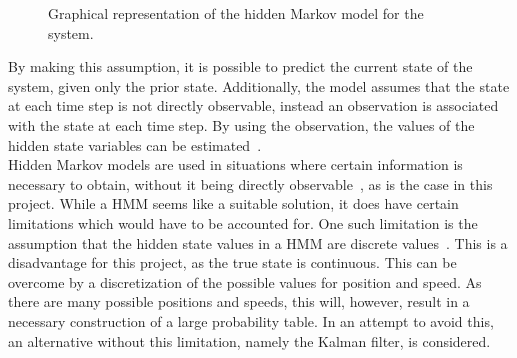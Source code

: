\begin{figure}[H]
\begin{center}
\end{center}
\caption{Graphical representation of the hidden Markov model for the system.}
\label{fig:hmm}
\end{figure}

By making this assumption, it is possible to predict the current state of the system, given only the prior state. Additionally, the model assumes that the state at each time step is not directly observable, instead an observation is associated with the state at each time step. By using the observation, the values of the hidden state variables can be estimated~\cite{poole2010artificial}. \\

Hidden Markov models are used in situations where certain information is necessary to obtain, without it being directly observable~\cite{ghahramani2001introduction}, as is the case in this project. While a HMM seems like a suitable solution, it does have certain limitations which would have to be accounted for. One such limitation is the assumption that the hidden state values in a HMM are discrete values~\cite{ghahramani2001introduction}. This is a disadvantage for this project, as the true state is continuous. This can be overcome by a discretization of the possible values for position and speed. As there are many possible positions and speeds, this will, however, result in a necessary construction of a large probability table. In an attempt to avoid this, an alternative without this limitation, namely the Kalman filter, is considered. 

